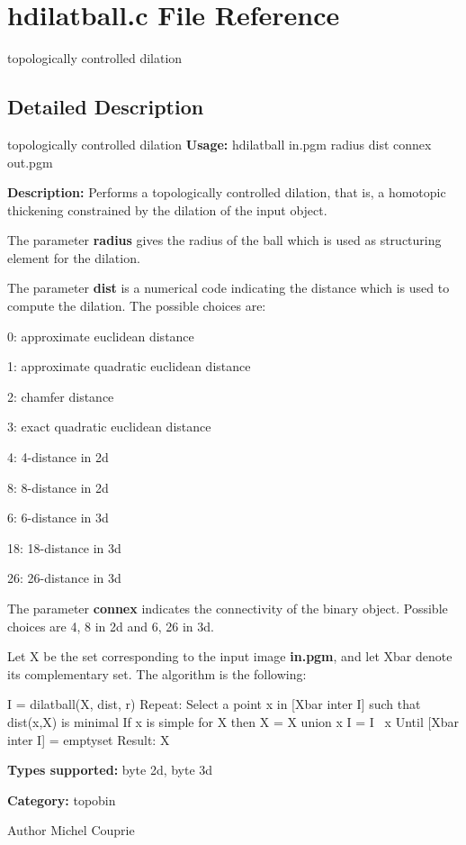 \section{hdilatball.c File Reference}
\label{hdilatball_8c}


topologically controlled dilation  




\subsection{Detailed Description}
topologically controlled dilation {\bfseries Usage:} hdilatball in.pgm radius dist connex out.pgm

{\bfseries Description:} Performs a topologically controlled dilation, that is, a homotopic thickening constrained by the dilation of the input object.

The parameter {\bfseries radius} gives the radius of the ball which is used as structuring element for the dilation.

The parameter {\bfseries dist} is a numerical code indicating the distance which is used to compute the dilation. The possible choices are: \begin{DoxyItemize}
\item 0: approximate euclidean distance \item 1: approximate quadratic euclidean distance \item 2: chamfer distance \item 3: exact quadratic euclidean distance \item 4: 4-\/distance in 2d \item 8: 8-\/distance in 2d \item 6: 6-\/distance in 3d \item 18: 18-\/distance in 3d \item 26: 26-\/distance in 3d\end{DoxyItemize}
The parameter {\bfseries connex} indicates the connectivity of the binary object. Possible choices are 4, 8 in 2d and 6, 26 in 3d.

Let X be the set corresponding to the input image {\bfseries in.pgm}, and let Xbar denote its complementary set. The algorithm is the following:

\begin{DoxyVerb}
I = dilatball(X, dist, r)
Repeat:
    Select a point x in [Xbar inter I] such that dist(x,X) is minimal
    If x is simple for X then
        X = X union {x}
	I = I \ {x}
Until [Xbar inter I] = emptyset
Result: X
\end{DoxyVerb}


{\bfseries Types supported:} byte 2d, byte 3d

{\bfseries Category:} topobin

\begin{DoxyAuthor}{Author}
Michel Couprie 
\end{DoxyAuthor}
